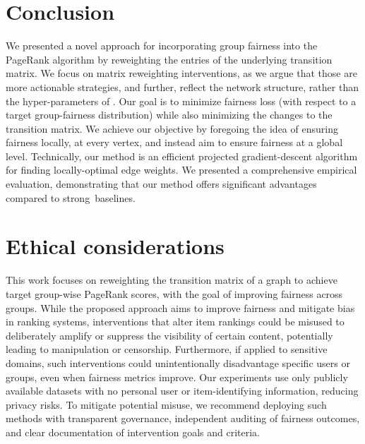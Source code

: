 \documentclass[sigconf, anonymous, review]{acmart}
\begin{document}
\section{Conclusion}

We presented a novel approach for incorporating group
fairness into the PageRank algorithm by re\-weighting the entries of the underlying transition matrix. 
We focus on matrix re\-weighting interventions, 
as we argue that those are more actionable strategies,
and further, reflect the network structure, rather than the hyper-parameters of \pagerank.
Our goal is to minimize fairness loss (with respect to a target group-fairness distribution)
while also minimizing the changes to the transition matrix. 
We achieve our objective by foregoing the idea of ensuring fairness locally, at every vertex, 
and instead aim to ensure fairness at a global level.
Technically, our method is an efficient projected gradient-descent algorithm for
finding locally-optimal edge weights.
We presented a comprehensive empirical evaluation, 
demonstrating that our method offers significant advantages compared to strong~baselines.

\clearpage
\section{Ethical considerations}

This work focuses on reweighting the transition matrix of a graph to achieve target group-wise PageRank scores, with the goal of improving fairness across groups. While the proposed approach aims to improve fairness and mitigate bias in ranking systems, interventions that alter item rankings could be misused to deliberately amplify or suppress the visibility of certain content, potentially leading to manipulation or censorship. Furthermore, if applied to sensitive domains, such interventions could unintentionally disadvantage specific users or groups, even when fairness metrics improve. Our experiments use only publicly available datasets with no personal user or item-identifying information, reducing privacy risks. To mitigate potential misuse, we recommend deploying such methods with transparent governance, independent auditing of fairness outcomes, and clear documentation of intervention goals and criteria.


\begin{acks}
\end{acks}
\balance




\clearpage
\appendix

\end{document}
